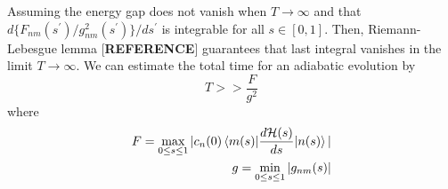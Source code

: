  Assuming the energy gap does not vanish when $T \rightarrow \infty$ and that $d\{F_{nm}(s^{\prime})/g_{nm}^{2}(s^{\prime})\}/ds^{\prime}$ is integrable for all $s \in [0,1]$. Then, Riemann-Lebesgue lemma [\textbf{REFERENCE}] guarantees that last integral vanishes in the limit $T \rightarrow \infty$. We can estimate the total time for an adiabatic evolution by
 \begin{equation}
     T >> \frac{F}{g^{2}}
 \end{equation}
 where
 \begin{align}
     F = \max_{0 \leq s \leq 1} |c_{n}(0)\braket{m(s)|\frac{d\mathcal{H}(s)}{ds}| n(s)}| \\
     g = \min_{0 \leq s \leq 1} |g_{nm}(s)|
 \end{align}
